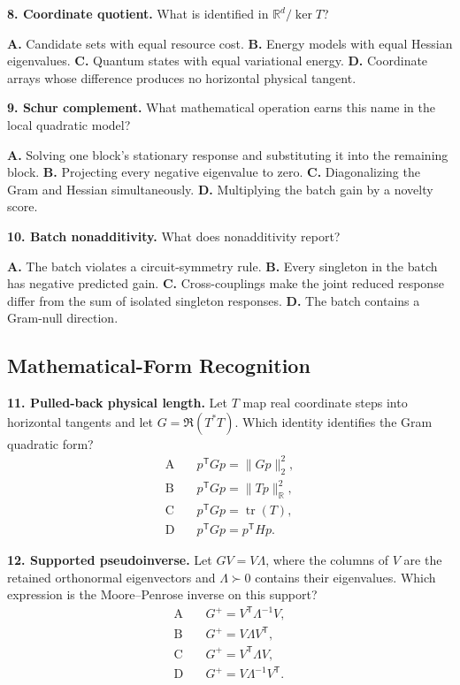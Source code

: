 \documentclass[10pt,twocolumn]{article}
\begin{document}
\textbf{8. Coordinate quotient.}
What is identified in \(\mathbb R^d/\ker T\)?

\textbf{A.} Candidate sets with equal resource cost.\quad
\textbf{B.} Energy models with equal Hessian eigenvalues.\quad
\textbf{C.} Quantum states with equal variational energy.\quad
\textbf{D.} Coordinate arrays whose difference produces no horizontal
physical tangent.

\textbf{9. Schur complement.}
What mathematical operation earns this name in the local quadratic model?

\textbf{A.} Solving one block's stationary response and substituting it into
the remaining block.\quad
\textbf{B.} Projecting every negative eigenvalue to zero.\quad
\textbf{C.} Diagonalizing the Gram and Hessian simultaneously.\quad
\textbf{D.} Multiplying the batch gain by a novelty score.

\textbf{10. Batch nonadditivity.}
What does nonadditivity report?

\textbf{A.} The batch violates a circuit-symmetry rule.\quad
\textbf{B.} Every singleton in the batch has negative predicted gain.\quad
\textbf{C.} Cross-couplings make the joint reduced response differ from the
sum of isolated singleton responses.\quad
\textbf{D.} The batch contains a Gram-null direction.

\subsection*{Mathematical-Form Recognition}

\textbf{11. Pulled-back physical length.}
Let \(T\) map real coordinate steps into horizontal tangents and let
\(G=\Re(T^*T)\). Which identity identifies the Gram quadratic form?
\[
\begin{aligned}
\mathrm{A}\quad&p^{\mathsf T}Gp=\|Gp\|_2^2,\\
\mathrm{B}\quad&p^{\mathsf T}Gp=\|Tp\|_{\mathbb R}^2,\\
\mathrm{C}\quad&p^{\mathsf T}Gp=\operatorname{tr}(T),\\
\mathrm{D}\quad&p^{\mathsf T}Gp=p^{\mathsf T}Hp.
\end{aligned}
\]

\textbf{12. Supported pseudoinverse.}
Let \(G V=V\Lambda\), where the columns of \(V\) are the retained orthonormal
eigenvectors and \(\Lambda\succ0\) contains their eigenvalues. Which expression
is the Moore--Penrose inverse on this support?
\[
\begin{aligned}
\mathrm{A}\quad&G^+=V^{\mathsf T}\Lambda^{-1}V,\\
\mathrm{B}\quad&G^+=V\Lambda V^{\mathsf T},\\
\mathrm{C}\quad&G^+=V^{\mathsf T}\Lambda V,\\
\mathrm{D}\quad&G^+=V\Lambda^{-1}V^{\mathsf T}.
\end{aligned}
\]
\end{document}

